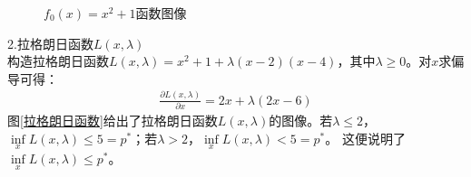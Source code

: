 \documentclass[12pt,a4paper]{ctexart}
\begin{document}
\begin{itemize}
\begin{figure}[!h]
        \caption{$f_0(x)=x^2+1$函数图像}
        \label{f_0(x)} %
    \end{figure}
    2.拉格朗日函数$L(x,\lambda)$\\
    构造拉格朗日函数$L(x,\lambda)=x^2+1+\lambda(x-2)(x-4)$，其中$\lambda \geq 0$。对$x$求偏导可得：
    \begin{align}
    \frac{\partial{L(x,\lambda)}}{\partial x}=2x+\lambda(2x-6) \label{qiudao}
    \end{align}
    图\ref{拉格朗日函数}给出了拉格朗日函数$L(x,\lambda)$的图像。若$\lambda \leq 2$，
    $\inf\limits_{x} L(x,\lambda) \leq 5=p^*$；若$\lambda > 2$，$\inf\limits_{x} L(x,\lambda) < 5=p^*$。
    这便说明了$\inf\limits_{x} L(x,\lambda) \leq p^*$。\\
    \begin{figure}[!h]
        \centering

\end{figure}
\end{itemize}
\end{document}
